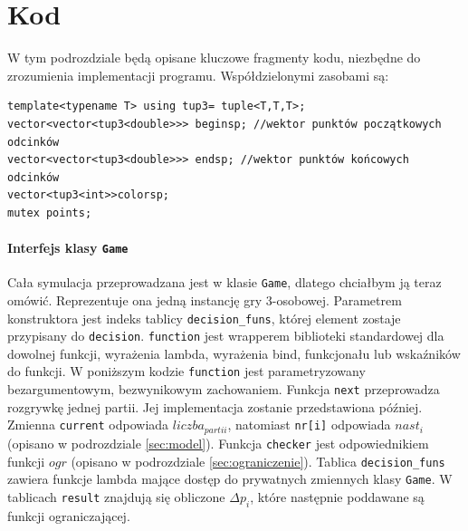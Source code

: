 \section{Kod}
\label{sec::kod}
W tym podrozdziale będą opisane kluczowe fragmenty kodu, niezbędne do zrozumienia implementacji programu. Współdzielonymi zasobami są:
\begin{lstlisting}
template<typename T> using tup3= tuple<T,T,T>;
vector<vector<tup3<double>>> beginsp; //wektor punktów początkowych odcinków
vector<vector<tup3<double>>> endsp; //wektor punktów końcowych odcinków
vector<tup3<int>>colorsp;
mutex points;
\end{lstlisting}

\paragraph{Interfejs klasy \texttt{Game}}
Cała symulacja przeprowadzana jest w klasie \texttt{Game}, dlatego chciałbym ją teraz omówić. Reprezentuje ona jedną instancję gry 3-osobowej. Parametrem konstruktora jest indeks tablicy \texttt{decision\_funs}, której element zostaje przypisany do \texttt{decision}. \texttt{function} jest wrapperem biblioteki standardowej dla dowolnej funkcji, wyrażenia lambda, wyrażenia bind, funkcjonału lub wskaźników do funkcji. W poniższym kodzie \texttt{function} jest parametryzowany bezargumentowym, bezwynikowym zachowaniem. Funkcja \texttt{next} przeprowadza rozgrywkę jednej partii. Jej implementacja zostanie przedstawiona później. Zmienna \texttt{current} odpowiada $liczba_{partii}$, natomiast \texttt{nr[i]} odpowiada $nast_i$ (opisano w podrozdziale \ref{sec:model}). Funkcja \texttt{checker} jest odpowiednikiem funkcji $ogr$ (opisano w podrozdziale \ref{sec:ograniczenie}). Tablica \texttt{decision\_funs} zawiera funkcje lambda mające dostęp do prywatnych zmiennych klasy \texttt{Game}. W tablicach \texttt{result} znajdują się obliczone $\Delta p_i$, które następnie poddawane są funkcji ograniczającej. 

